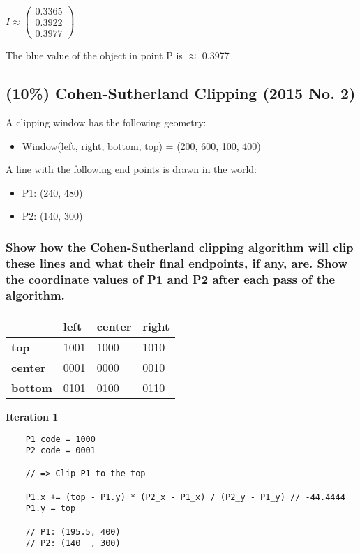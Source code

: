 $
    I
\approx
    \left(\begin{array}{c}
        0.3365\\
        0.3922\\
        0.3977
    \end{array}\right)
$

The blue value of the object in point P is $\approx$ 0.3977

\newpage
\subsection{(10\%) Cohen-Sutherland Clipping (2015 No. 2)}
A clipping window has the following geometry:
\begin{itemize}
    \item Window(left, right, bottom, top) = (200, 600, 100, 400) 
\end{itemize}
 
A line with the following end points is drawn in the world: 
\begin{itemize}
    \item P1: (240, 480) 
    \item P2: (140, 300) 
\end{itemize}
 
\subsubsection{Show how the Cohen-Sutherland clipping algorithm will clip these lines and what their final endpoints, if any, are.  Show the coordinate values of P1 and P2 after each pass of the algorithm.}

\begin{tabular}{|l|l|l|l|}
    \hline
    & \textbf{left} & \textbf{center} & \textbf{right} \\   \hline
    \textbf{top}    & 1001 & 1000   & 1010 \\    \hline
    \textbf{center} & 0001 & 0000   & 0010 \\    \hline
    \textbf{bottom} & 0101 & 0100   & 0110 \\    \hline
\end{tabular}

\textbf{Iteration 1}

\begin{verbatim}
    P1_code = 1000
    P2_code = 0001
    
    // => Clip P1 to the top

    P1.x += (top - P1.y) * (P2_x - P1_x) / (P2_y - P1_y) // -44.4444
    P1.y = top

    // P1: (195.5, 400)
    // P2: (140  , 300)
\end{verbatim}

